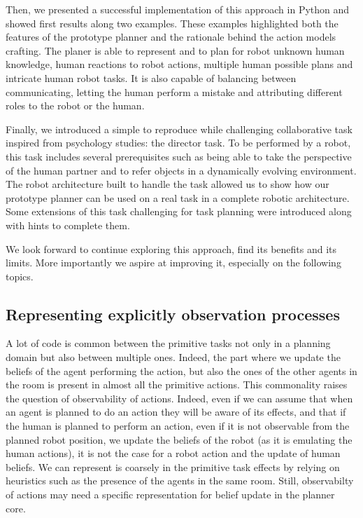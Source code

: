 \documentclass[a4paper,11pt,twoside]{StyleThese}
\begin{document}
Then, we presented a successful implementation of this approach in Python and showed first results along two examples. These examples highlighted both the features of the prototype planner and the rationale behind the action models crafting. The planer is able to represent and to plan for robot unknown human knowledge, human reactions to robot actions, multiple human possible plans and intricate human robot tasks. It is also capable of balancing between communicating, letting the human perform a mistake and attributing different roles to the robot or the human.

Finally, we introduced a simple to reproduce while challenging collaborative task inspired from psychology studies: the director task. To be performed by a robot, this task includes several prerequisites such as being able to take the perspective of the human partner and to refer objects in a dynamically evolving environment. The robot architecture built to handle the task allowed us to show how our prototype planner can be used on a real task in a complete robotic architecture. Some extensions of this task challenging for task planning were introduced along with hints to complete them.

We look forward to continue exploring this approach, find its benefits and its limits. More importantly we aspire at improving it, especially on the following topics.

\subsection{Representing explicitly observation processes}
A lot of code is common between the primitive tasks not only in a planning domain but also between multiple ones. Indeed, the part where we update the beliefs of the agent performing the action, but also the ones of the other agents in the room is present in almost all the primitive actions. This commonality raises the question of observability of actions. Indeed, even if we can assume that when an agent is planned to do an action they will be aware of its effects, and that if the human is planned to perform an action, even if it is not observable from the planned robot position, we update the beliefs of the robot (as it is emulating the human actions), it is not the case for a robot action and the update of human beliefs. We can represent is coarsely in the primitive task effects by relying on heuristics such as the presence of the agents in the same room. Still, observabilty of actions may need a specific representation for belief update in the planner core.
\end{document}
